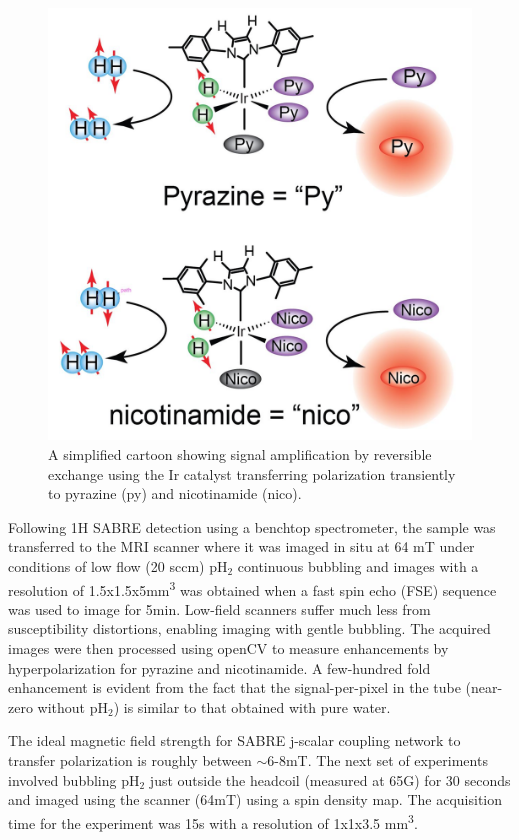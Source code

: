 \documentclass[final,3p,times,twocolumn]{elsarticle}
\begin{document}
\begin{figure}
    \centering
    \includegraphics[width=\linewidth]{Picture3.png}
    \caption{A simplified cartoon showing signal amplification by reversible exchange using the Ir catalyst transferring polarization transiently to pyrazine (py) and nicotinamide (nico). }
    \label{fig:my_label}
\end{figure}

Following 1H SABRE detection using a benchtop spectrometer, the sample was transferred to the MRI scanner where it was imaged in situ\cite{coffey2014high}\cite{barskiy2014situ}\cite{kovtunov2017imaging} at 64 mT under conditions of low flow (20 sccm) pH$_{\mathrm{2}}$ continuous bubbling and images with a resolution of 1.5x1.5x5mm\textsuperscript{3} was obtained when a fast spin echo (FSE) sequence was used to image for 5min. Low-field scanners suffer much less from susceptibility distortions, enabling imaging with gentle bubbling.
The acquired images were then processed using openCV to measure enhancements by hyperpolarization for pyrazine and nicotinamide.
A few-hundred fold enhancement is evident from the fact that the signal-per-pixel in the tube (near-zero without pH$_{\mathrm{2}}$) is similar to that obtained with pure water. 
\par The ideal magnetic field strength for SABRE j-scalar coupling network to transfer polarization is roughly between $\sim$6-8mT. The next set of experiments involved bubbling pH$_{\mathrm{2}}$ just outside the headcoil (measured at 65G) for 30 seconds and imaged using the scanner (64mT) using a spin density map. The acquisition time for the experiment was 15s with a resolution of 1x1x3.5 mm\textsuperscript{3}. 
\end{document}
